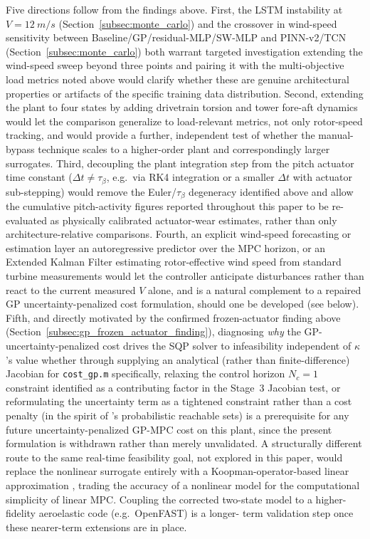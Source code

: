 Five directions follow from the findings above. First, the LSTM
instability at $V=\SI{12}{m/s}$ (Section~\ref{subsec:monte_carlo}) and
the crossover in wind-speed sensitivity between
Baseline/GP/residual-MLP/SW-MLP and PINN-v2/TCN
(Section~\ref{subsec:monte_carlo}) both warrant targeted investigation
 extending the wind-speed sweep beyond three points and pairing it
with the multi-objective load metrics noted above would clarify whether
these are genuine architectural properties or artifacts of the specific
training data distribution. Second, extending the plant to four states
by adding drivetrain torsion and tower fore-aft dynamics
\citep{schlipf2013} would let the comparison generalize to
load-relevant metrics, not only rotor-speed tracking, and would provide
a further, independent test of whether the manual-bypass technique
scales to a higher-order plant and correspondingly larger surrogates.
Third, decoupling the plant integration step from the pitch actuator
time constant ($\Delta t \ne \tau_\beta$, e.g.\ via RK4 integration or
a smaller $\Delta t$ with actuator sub-stepping) would remove the
Euler/$\tau_\beta$ degeneracy identified above and allow the cumulative
pitch-activity figures reported throughout this paper to be
re-evaluated as physically calibrated actuator-wear estimates, rather
than only architecture-relative comparisons. Fourth, an explicit
wind-speed forecasting or estimation layer an
autoregressive predictor over the MPC horizon, or an Extended Kalman
Filter estimating rotor-effective wind speed from standard turbine
measurements \citep{soltani2013} would let the controller anticipate
disturbances rather than react to the current measured $V$ alone, and
is a natural complement to a repaired GP uncertainty-penalized cost
formulation, should one be developed (see below).
Fifth, and directly motivated
by the confirmed frozen-actuator finding above
(Section~\ref{subsec:gp_frozen_actuator_finding}), diagnosing
\emph{why} the GP-uncertainty-penalized cost drives the SQP solver to
infeasibility independent of $\kappa$'s value whether through
supplying an analytical (rather than finite-difference) Jacobian for
\texttt{cost\_gp.m} specifically, relaxing the control horizon
$N_c=1$ constraint identified as a contributing factor in the Stage~3
Jacobian test, or reformulating the uncertainty term as a tightened
constraint rather than a cost penalty (in the spirit of
\citet{hewing2020}'s probabilistic reachable sets) is a prerequisite
for any future uncertainty-penalized GP-MPC cost on this plant, since
the present formulation is withdrawn rather than merely unvalidated.
A structurally different route to the same real-time
feasibility goal, not explored in this paper, would replace the
nonlinear surrogate entirely with a Koopman-operator-based linear
approximation \citep{williams2015}, trading the accuracy of a
nonlinear model for the computational simplicity of linear MPC.
Coupling the corrected two-state
model to a higher-fidelity aeroelastic code (e.g.\ OpenFAST) is a longer-
term validation step once these nearer-term extensions are in place.
